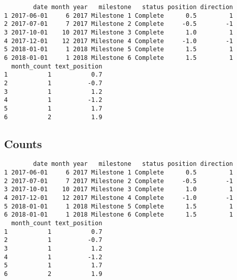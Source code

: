 \begin{verbatim}
        date month year   milestone   status position direction
1 2017-06-01     6 2017 Milestone 1 Complete      0.5         1
2 2017-07-01     7 2017 Milestone 2 Complete     -0.5        -1
3 2017-10-01    10 2017 Milestone 3 Complete      1.0         1
4 2017-12-01    12 2017 Milestone 4 Complete     -1.0        -1
5 2018-01-01     1 2018 Milestone 5 Complete      1.5         1
6 2018-01-01     1 2018 Milestone 6 Complete      1.5         1
  month_count text_position
1           1           0.7
2           1          -0.7
3           1           1.2
4           1          -1.2
5           1           1.7
6           2           1.9
\end{verbatim}
\hypertarget{counts}{%
\subsection{Counts}\label{counts}}
\begin{Shaded}
\begin{Highlighting}[]
\OtherTok{\textless{}{-}} 

\SpecialCharTok{$}\OtherTok{\textless{}{-}} \SpecialCharTok{$}\SpecialCharTok{==}\SpecialCharTok{$}\SpecialCharTok{$}
\SpecialCharTok{$}\OtherTok{\textless{}{-}}\SpecialCharTok{$}\SpecialCharTok{*}\SpecialCharTok{*}\SpecialCharTok{$}\SpecialCharTok{+}\SpecialCharTok{$}
\end{Highlighting}
\end{Shaded}
\begin{verbatim}
        date month year   milestone   status position direction
1 2017-06-01     6 2017 Milestone 1 Complete      0.5         1
2 2017-07-01     7 2017 Milestone 2 Complete     -0.5        -1
3 2017-10-01    10 2017 Milestone 3 Complete      1.0         1
4 2017-12-01    12 2017 Milestone 4 Complete     -1.0        -1
5 2018-01-01     1 2018 Milestone 5 Complete      1.5         1
6 2018-01-01     1 2018 Milestone 6 Complete      1.5         1
  month_count text_position
1           1           0.7
2           1          -0.7
3           1           1.2
4           1          -1.2
5           1           1.7
6           2           1.9
\end{verbatim}
